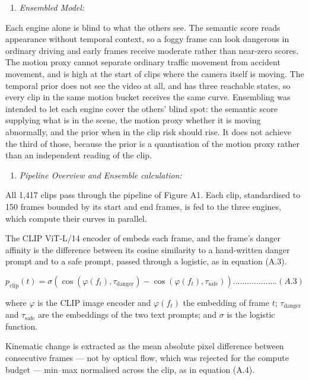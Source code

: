 \begin{enumerate}
\def\labelenumi{\arabic{enumi}.}
\setcounter{enumi}{3}
\item
  \emph{Ensembled Model:}
\end{enumerate}

Each engine alone is blind to what the others see. The semantic score reads appearance without temporal context, so a foggy frame can look dangerous in ordinary driving and early frames receive moderate rather than near-zero scores. The motion proxy cannot separate ordinary traffic movement from accident movement, and is high at the start of clips where the camera itself is moving. The temporal prior does not see the video at all, and has three reachable states, so every clip in the same motion bucket receives the same curve. Ensembling was intended to let each engine cover the others'{} blind spot: the semantic score supplying what is in the scene, the motion proxy whether it is moving abnormally, and the prior when in the clip risk should rise. It does not achieve the third of those, because the prior is a quantisation of the motion proxy rather than an independent reading of the clip.

\begin{enumerate}
\def\labelenumi{\arabic{enumi}.}
\setcounter{enumi}{4}
\item
  \emph{Pipeline Overview and Ensemble calculation:}
\end{enumerate}

All 1,417 clips pass through the pipeline of Figure A1. Each clip, standardised to 150 frames bounded by its start and end frames, is fed to the three engines, which compute their curves in parallel.

The CLIP ViT-L/14 encoder of \citet{radford2021clip} embeds each frame, and the frame's danger affinity is the difference between its cosine similarity to a hand-written danger prompt and to a safe prompt, passed through a logistic, as in equation (A.3).

\[p_{\text{clip}}(t) = \sigma\left( \cos\left( \varphi(f_{t}),\tau_{\text{danger}} \right) - \cos\left( \varphi(f_{t}),\tau_{\text{safe}} \right) \right)\ldots\ldots\ldots\ldots\ldots\ldots.(A.3)\]

where \(\varphi\) is the CLIP image encoder and \(\varphi(f_{t})\) the embedding of frame \(t\); \(\tau_{\text{danger}}\) and \(\tau_{\text{safe}}\) are the embeddings of the two text prompts; and \(\sigma\) is the logistic function.

Kinematic change is extracted as the mean absolute pixel difference between consecutive frames --- not by optical flow, which was rejected for the compute budget --- min--max normalised across the clip, as in equation (A.4).

